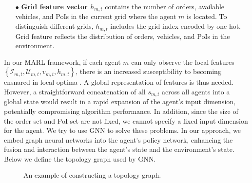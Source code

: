 \begin{itemize}
\item[$\bullet$] 
\textbf{Grid feature vector $h_{m,t}$} contains the number of orders, available vehicles, and PoIs in the current grid where the agent $m$ is located. To distinguish different grids, $h_{m,t}$ includes the grid index encoded by one-hot. Grid feature reflects the distribution of orders, vehicles, and PoIs in the environment.
\end{itemize}

In our MARL framework, if each agent $m$ can only observe the local features $\left\{ \mathcal{I}_{m,t}, \mathcal{U}_{m,t}, v_{m,t}, h_{m,t}\right\}$, there is an increased susceptibility to becoming ensnared in local optima \cite{liyihong}. A global representation of features is thus needed. However, a straightforward concatenation of all $s_{m,t}$ across all agents into a global state would result in a rapid expansion of the agent's input dimension, potentially compromising algorithm performance. In addition, since the size of the order set and PoI set are not fixed, we cannot specify a fixed input dimension for the agent. We try to use GNN to solve these problems. In our approach, we embed graph neural networks into the agent's policy network, enhancing the fusion and interaction between the agent's state and the environment's state. Below we define the topology graph used by GNN.

\begin{figure}[t]
\centering  %
\caption{An example of constructing a topology graph.}
\label{fig: example of topo}
\end{figure}

